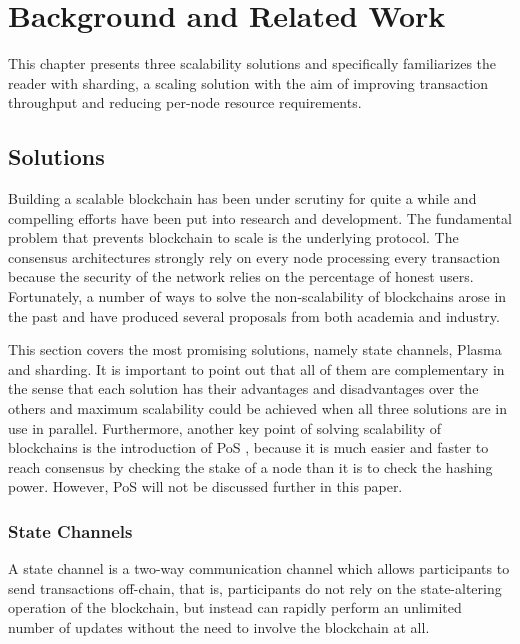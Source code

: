 
\chapter{Background and Related Work}

\label{Chapter:Background}

This chapter presents three scalability solutions and specifically familiarizes the reader with sharding, a scaling solution with the aim of improving transaction throughput and reducing per-node resource requirements. 

\section{Solutions}

Building a scalable blockchain has been under scrutiny for quite a while and compelling efforts have been put into research and development. The fundamental problem that prevents blockchain to scale is the underlying protocol. The consensus architectures strongly rely on every node processing every transaction because the security of the network relies on the percentage of honest users. Fortunately, a number of ways to solve the non-scalability of blockchains arose in the past and have produced several proposals from both academia and industry.

This section covers the most promising solutions, namely state channels, Plasma and sharding. It is important to point out that all of them are complementary in the sense that each solution has their advantages and disadvantages over the others and maximum scalability could be achieved when all three solutions are in use in parallel. Furthermore, another key point of solving scalability of blockchains is the introduction of PoS \parencite{Spasovski:2017:PSB:3167020.3167058}, because it is much easier and faster to reach consensus by checking the stake of a node than it is to check the hashing power. However, PoS will not be discussed further in this paper.

\subsection{State Channels}

A state channel is a two-way communication channel which allows participants to send transactions off-chain, that is, participants do not rely on the state-altering operation of the blockchain, but instead can rapidly perform an unlimited number of updates without the need to involve the blockchain at all. 


